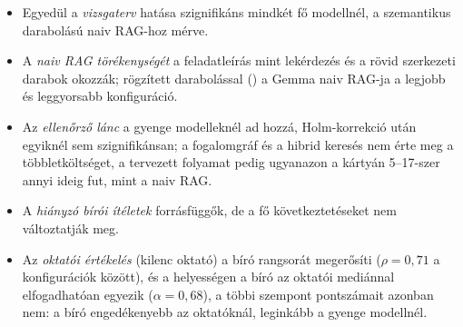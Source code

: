 \begin{itemize}[leftmargin=*,itemsep=1pt,topsep=2pt]
\item Egyedül a \emph{vizsgaterv} hatása szignifikáns mindkét fő modellnél, a szemantikus darabolású naiv RAG-hoz mérve.
\item A \emph{naiv RAG törékenységét} a feladatleírás mint lekérdezés és a rövid szerkezeti darabok okozzák; rögzített darabolással () a Gemma naiv RAG-ja a legjobb és leggyorsabb konfiguráció.
\item Az \emph{ellenőrző lánc} a gyenge modelleknél ad hozzá, Holm-korrekció után egyiknél sem szignifikánsan; a fogalomgráf és a hibrid keresés nem érte meg a többletköltséget, a tervezett folyamat pedig ugyanazon a kártyán 5--17-szer annyi ideig fut, mint a naiv RAG.
\item A \emph{hiányzó bírói ítéletek} forrásfüggők, de a fő következtetéseket nem változtatják meg.
\item Az \emph{oktatói értékelés} (kilenc oktató) a bíró rangsorát megerősíti ($\rho=0{,}71$ a konfigurációk között), és a helyességen a bíró az oktatói mediánnal elfogadhatóan egyezik ($\alpha=0{,}68$), a többi szempont pontszámait azonban nem: a bíró engedékenyebb az oktatóknál, leginkább a gyenge modellnél.
\end{itemize}
